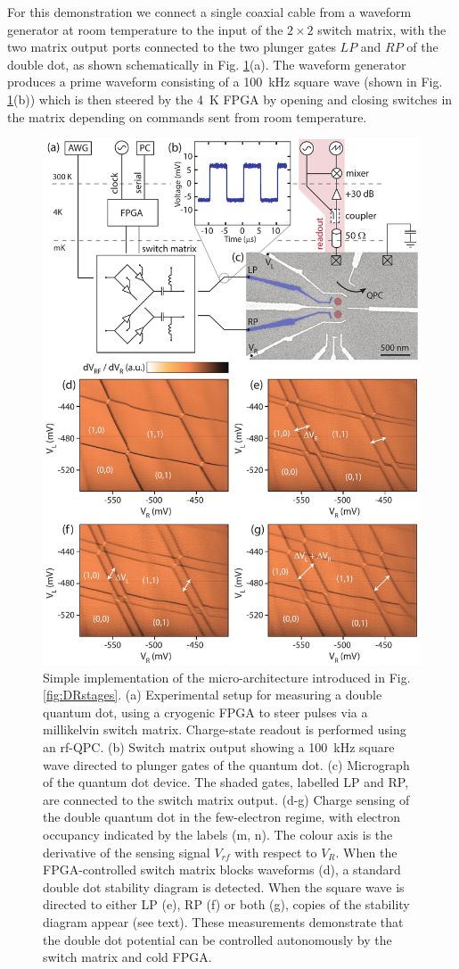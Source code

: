 For this demonstration we connect a single coaxial cable from a waveform generator at room temperature to the input of the $2\times2$ switch matrix, with the two matrix output ports connected to the two plunger gates $LP$ and $RP$ of the double dot, as shown schematically in Fig. \ref{fig:combined}(a).  The waveform generator produces a prime waveform consisting of a \SI{100}{\kilo\hertz} square wave (shown in Fig. \ref{fig:combined}(b)) which is then steered by the \SI{4}{\kelvin} FPGA by opening and closing switches in the matrix depending on commands sent from room temperature.

\begin{figure}
\includegraphics[width=0.8\linewidth]{Fig5_arch}
\caption[Implementation of proposed micro-architecture]{\label{fig:combined} Simple implementation of the micro-architecture introduced in Fig. \ref{fig:DRstages}. (a) Experimental setup for measuring a double quantum dot, using a cryogenic FPGA to steer pulses via a millikelvin switch matrix. Charge-state readout is performed using an rf-QPC. (b) Switch matrix output showing a \SI{100}{\kilo\hertz} square wave directed to plunger gates of the quantum dot. (c) Micrograph of the quantum dot device. The shaded gates, labelled LP and RP, are connected to the switch matrix output. (d-g) Charge sensing of the double quantum dot in the few-electron regime, with electron occupancy indicated by the labels (m, n). The colour axis is the derivative of the sensing signal $V_{rf}$ with respect to $V_R$. When the FPGA-controlled switch matrix blocks waveforms (d), a standard double dot stability diagram is detected. When the square wave is directed to either LP (e), RP (f) or both (g), copies of the stability diagram appear (see text). These measurements demonstrate that the double dot potential can be controlled autonomously by the switch matrix and cold FPGA.}
\end{figure}

